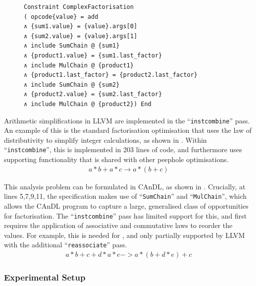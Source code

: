 \begin{figure}[t]
\begin{lstlisting}[language=CAnDL,label={fig:facopport},caption=
   {Factorisation opportunities in CAnDL: This captures some opportunities that
    LLVM ``{\tt instcombine}'' misses. ``{\tt SumChain}'', ``{\tt MulChain}''
    are themselves specified in CAnDL (16 LoC).}]
Constraint ComplexFactorisation
( opcode{value} = add
∧ {sum1.value} = {value}.args[0]
∧ {sum2.value} = {value}.args[1]
∧ include SumChain @ {sum1}
∧ {product1.value} = {sum1.last_factor}
∧ include MulChain @ {product1}
∧ {product1.last_factor} = {product2.last_factor}
∧ include SumChain @ {sum2}
∧ {product2.value} = {sum2.last_factor}
∧ include MulChain @ {product2}) End
\end{lstlisting}
\end{figure}

    Arithmetic simplifications in LLVM are implemented in the
    ``{\tt instcombine}'' pass.
    An example of this is the standard factorisation optimisation that uses the
    law of distributivity to simplify integer calculations, as shown in
    .
    Within ``{\tt instcombine}'', this is implemented in 203 lines of code, and
    furthermore uses supporting functionality that is shared with other peephole
    optimisations.
    \begin{align}
        a*b+a*c\rightarrow a*(b+c)
        \label{fig:factorization1}
    \end{align}

    This analysis problem can be formulated in CAnDL, as shown in
    .
    Crucially, at lines 5,7,9,11, the specification makes use of
    ``{\tt SumChain}'' and ``{\tt MulChain}'', which allows the CAnDL program to
    capture a large, generalised class of opportunities for factorisation.
    The ``{\tt instcombine}'' pass has limited support for this, and first
    requires the application of associative and commutative laws to reorder the
    values.
    For example, this is needed for , and only
    partially supported by LLVM with the additional ``{\tt reassociate}''
    pass.
    \begin{align}
        a*b+c+d*a*e->a*(b+d*e)+c
        \label{fig:factorization2}
    \end{align}

\subsubsection{Experimental Setup}


